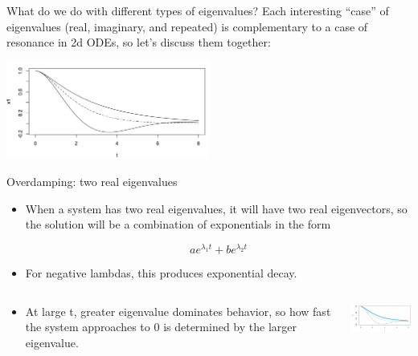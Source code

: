 
\begin{frame}{What do we do with different types of eigenvalues?}
	    Each interesting “case” of eigenvalues (real, imaginary, and repeated) is complementary to a case of resonance in 2d ODEs, so let’s discuss them together:
        
        \begin{center}
            \includegraphics[width=0.5\textwidth]{./images/eigenvalue-types-1.png}
        \end{center}
	\end{frame}
	
	\begin{frame}{Overdamping: two real eigenvalues}
	    \begin{itemize}
	        \item When a system has two real eigenvalues, it will have two real eigenvectors, so the solution will be a combination of exponentials in the form 
            
            $$ae^{\lambda_1t} + be^{\lambda_2t}$$
            
            \item For negative lambdas, this produces exponential decay.
            
            \item
            \begin{columns}[onlytextwidth,T]
            \column{\dimexpr\linewidth-40mm-5mm}
        	    At large t, greater eigenvalue dominates behavior, so how fast the system approaches to 0 is determined by the larger eigenvalue.
        	
        	\column{40mm}
        	    \includegraphics[width=40mm]{./images/eigenvalue-types-3.png}
    	    \end{columns}
	    \end{itemize}
	\end{frame}
	
